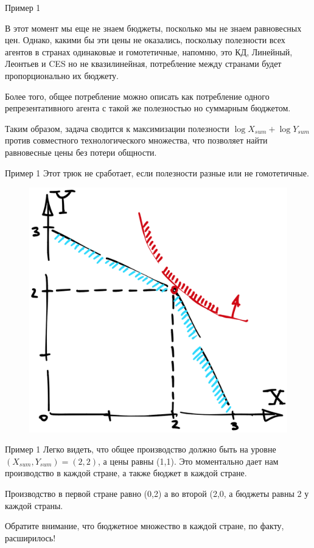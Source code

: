 \documentclass{beamer}
\begin{document}
\begin{frame}{Пример 1}

В этот момент мы еще не знаем бюджеты, посколько мы не знаем равновесных цен. Однако, какими бы эти цены не оказались, \alert{поскольку полезности всех агентов в странах одинаковые и гомотетичные}, напомню, это КД, Линейный, Леонтьев и CES но не квазилинейная, \alert{потребление между странами будет пропорционально их бюджету}.

Более того, \alert{общее потребление можно описать как потребление одного репрезентативного агента} с такой же полезностью но суммарным бюджетом.

Таким образом, задача сводится к максимизации полезности $\log X_{sum} + \log Y_{sum}$ против совместного технологического множества, \alert{что позволяет найти равновесные цены без потери общности}.
\end{frame}

\begin{frame}{Пример 1}
Этот трюк не сработает, если полезности разные или не гомотетичные.
\begin{figure}[hbt]
\centering
\includegraphics[width=.6 \textwidth]{pic1.png}
\end{figure}
\end{frame}

\begin{frame}{Пример 1}
Легко видеть, что общее производство должно быть на уровне $(X_{sum},Y_{sum}) = (2,2)$, а цены равны (1,1). Это моментально дает нам производство в каждой стране, а также бюджет в каждой стране.

Производство в первой стране равно (0,2) а во второй (2,0, а бюджеты равны 2 у каждой страны.

Обратите внимание, что бюджетное множество в каждой стране, по факту, расширилось!

\end{frame}
\end{document}
